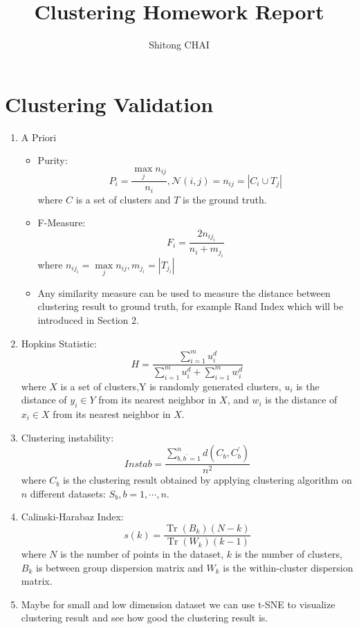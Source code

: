 \documentclass{article}
\title{Clustering Homework Report}
\date{}
\author{Shitong CHAI}
\DeclareMathOperator{\Tr}{Tr}
\begin{document}
\maketitle

\section {Clustering Validation}
\begin{enumerate}
\item A Priori
\begin{itemize}
\item Purity: 
$$
P_i = \frac{\max\limits_j n_{ij}}{n_i}, \mathcal{N}(i,j)=n_{ij}=|C_i\cup T_j|
$$
 where $C$ is a set of clusters and $T$ is the ground truth.
\item F-Measure: $$F_i=\frac{2n_{ij_i}}{n_i+m_{j_i}}$$ where $n_{ij_i}=\max\limits_j n_{ij}, m_{j_i}=|T_{j_i}|$
\item Any similarity measure can be used to measure the distance between clustering result to ground truth, for example Rand Index which will be introduced in Section 2.
\end{itemize}
\item Hopkins Statistic: $$H=\frac{\sum\limits_{i=1}^m u_i^d}{\sum\limits_{i=1}^m u_i^d+\sum\limits_{i=1}^m w_i^d}$$ where $X$ is a set of clusters,Y is randomly generated clusters, $u_i$ is the distance of $y_i\in Y$ from its nearest neighbor in $X$, and $w_i$ is the distance of $x_i\in X$ from its nearest neighbor in $X$.
\item Clustering instability: $$Instab=\frac{\sum\limits_{b,b^\prime=1}^n d(C_b,C_b^\prime)}{n^2}$$ where $C_b$ is the clustering result obtained by applying clustering algorithm on $n$ different datasets: $S_b, b=1,\cdots,n$.
\item Calinski-Harabaz Index: $$s(k)=\frac{\Tr(B_k)(N-k)}{\Tr(W_k)(k-1)}$$ where $N$ is the number of points in the dataset, $k$ is the number of clusters, $B_k$ is between group dispersion matrix and $W_k$ is the within-cluster dispersion matrix.
\item Maybe for small and low dimension dataset we can use t-SNE to visualize clustering result and see how good the clustering result is.
\end{enumerate}
\end{document}
